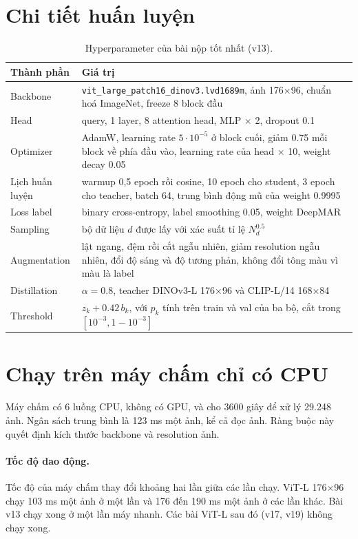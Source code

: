 \documentclass[11pt,a4paper]{article}
\begin{document}
\section{Chi tiết huấn luyện}
\label{app:hp}

\begin{table}[H]
\centering\small
\begin{tabularx}{\linewidth}{@{}lX@{}}
\toprule
Thành phần & Giá trị \\
\midrule
Backbone & \texttt{vit\_large\_patch16\_dinov3.lvd1689m}, ảnh 176×96, chuẩn hoá ImageNet, freeze 8 block đầu \\
Head & query, 1 layer, 8 attention head, MLP × 2, dropout 0.1 \\
Optimizer & AdamW, learning rate $5\cdot10^{-5}$ ở block cuối, giảm 0.75 mỗi block về phía đầu vào, learning rate của head × 10, weight decay 0.05 \\
Lịch huấn luyện & warmup 0,5 epoch rồi cosine, 10 epoch cho student, 3 epoch cho teacher, batch 64, trung bình động mũ của weight 0.9995 \\
Loss label & binary cross-entropy, label smoothing 0.05, weight DeepMAR \\
Sampling & bộ dữ liệu $d$ được lấy với xác suất tỉ lệ $N_d^{0.5}$ \\
Augmentation & lật ngang, đệm rồi cắt ngẫu nhiên, giảm resolution ngẫu nhiên, đổi độ sáng và độ tương phản, không đổi tông màu vì màu là label \\
Distillation & $\alpha=0.8$, teacher DINOv3-L 176×96 và CLIP-L/14 168×84 \\
Threshold & $z_k + 0.42\,b_k$, với $p_k$ tính trên train và val của ba bộ, cắt trong $[10^{-3},1-10^{-3}]$ \\
\bottomrule
\end{tabularx}
\caption{Hyperparameter của bài nộp tốt nhất (v13).}
\end{table}

\section{Chạy trên máy chấm chỉ có CPU}
\label{app:cpu}

Máy chấm có 6 luồng CPU, không có GPU, và cho 3600 giây để xử lý 29.248 ảnh. Ngân sách trung bình là 123 ms một ảnh, kể cả đọc ảnh. Ràng buộc này quyết định kích thước backbone và resolution ảnh.

\paragraph{Tốc độ dao động.} Tốc độ của máy chấm thay đổi khoảng hai lần giữa các lần chạy. ViT-L 176×96 chạy 103 ms một ảnh ở một lần và 176 đến 190 ms một ảnh ở các lần khác. Bài v13 chạy xong ở một lần máy nhanh. Các bài ViT-L sau đó (v17, v19) không chạy xong.
\end{document}
